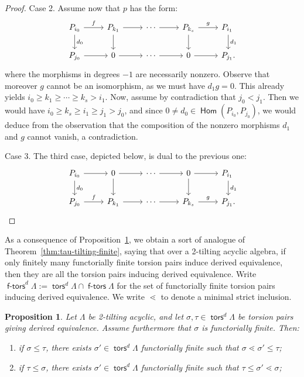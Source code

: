 \documentclass[a4paper,11pt]{amsart}
\theoremstyle{plain}
\newtheorem{prop}[thm]{Proposition}
\theoremstyle{definition}
\DeclareMathOperator{\Hom}{\mathsf{Hom}}
\DeclareMathOperator{\ftors}{\mathsf{f-tors}}
\DeclareMathOperator{\tors}{\mathsf{tors}}
\begin{document}
\begin{proof}
	Case 2. Assume now that $p$ has the form:
	\[\begin{tikzcd}
		P_{i_0} \ar{d}{d_0} \ar{r}{f} & P_{k_1} \ar{d} \ar{r} & \cdots
		\ar{r} & P_{k_s} \ar{d} \ar{r}{g} & P_{i_1}\phantom{.} \ar{d}{d_1} \\
		P_{j_0} \ar{r} & 0 \ar{r} & \cdots \ar{r} & 0 \ar{r} & P_{j_1}.
	\end{tikzcd}\]
	where the morphisms in degrees $-1$ are necessarily nonzero. Observe that
	moreover $g$ cannot be an isomorphism, as we must have $d_1g=0$. This already
	yields $i_0\geq k_1\geq \cdots \geq k_s > i_1$. Now, assume by contradiction
	that $j_0<j_1$. Then we would have $i_0\geq k_s\geq i_1 \geq j_1 >j_0$, and since
	$0\neq d_0\in\Hom(P_{i_0},P_{j_0})$, we would deduce from the observation that
	the composition of the nonzero morphisms $d_1$ and $g$ cannot vanish, a contradiction.

	Case 3. The third case, depicted below, is dual to the previous one:
	\[\begin{tikzcd}
		P_{i_0} \ar{d}{d_0} \ar{r} & 0 \ar{d} \ar{r} & \cdots
		\ar{r} & 0 \ar{d} \ar{r} & P_{i_1} \phantom{.} \ar{d}{d_1} \\
		P_{j_0} \ar{r}{f} & P_{k_1} \ar{r} & \cdots \ar{r} & P_{k_s} \ar{r}{g} & P_{j_1}.
	\end{tikzcd}\]
\end{proof}

As a consequence of Proposition~\ref{prop:2-tilting-acyclic}, we obtain a sort of analogue of
Theorem~\ref{thm:tau-tilting-finite}, saying that over a 2-tilting acyclic
algebra, if only finitely many functorially finite torsion pairs induce derived
equivalence, then they are all the torsion pairs inducing derived equivalence.
Write $\ftors^d\Lambda:=\tors^d\Lambda\cap\ftors\Lambda$ for the set of
functorially finite torsion pairs inducing derived equivalence. We write
$\lessdot$ to denote a minimal strict inclusion.

\begin{prop}\label{prop:2-tilting-acyclic}
	Let $\Lambda$ be 2-tilting acyclic, and let $\sigma,
	\tau\in\tors^d\Lambda$ be torsion pairs giving derived equivalence. Assume
	furthermore that $\sigma$ is functorially finite. Then:
	\begin{enumerate}
		\item if $\sigma\leq \tau$, there exists $\sigma'\in\tors^d\Lambda$ functorially
			finite such that $\sigma\lessdot \sigma'\leq \tau$;
		\item if $\tau\leq \sigma$, there exists $\sigma'\in\tors^d\Lambda$ functorially
			finite such that $\tau\leq \sigma'\lessdot \sigma$;
	\end{enumerate}
\end{prop}
\end{document}
